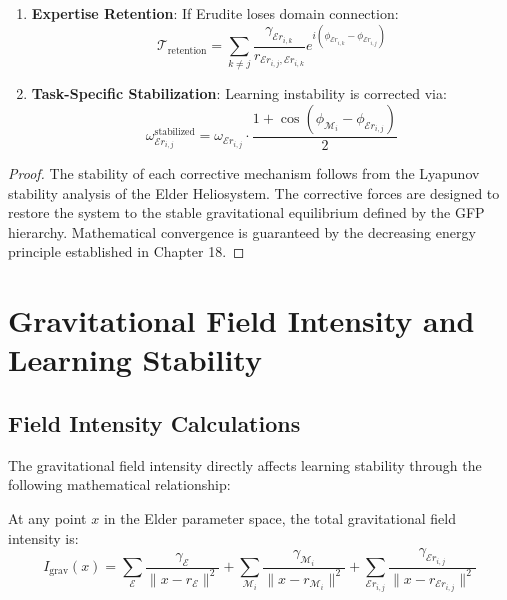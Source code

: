 \begin{theorem}
\begin{enumerate}
    \item \textbf{Expertise Retention}: If Erudite loses domain connection:
    \begin{equation}
    \mathcal{T}_{\text{retention}} = \sum_{k \neq j} \frac{\gamma_{\mathcal{E}r_{i,k}}}{r_{\mathcal{E}r_{i,j},\mathcal{E}r_{i,k}}} e^{i(\phi_{\mathcal{E}r_{i,k}} - \phi_{\mathcal{E}r_{i,j}})}
    \end{equation}
    
    \item \textbf{Task-Specific Stabilization}: Learning instability is corrected via:
    \begin{equation}
    \omega_{\mathcal{E}r_{i,j}}^{\text{stabilized}} = \omega_{\mathcal{E}r_{i,j}} \cdot \frac{1 + \cos(\phi_{\mathcal{M}_i} - \phi_{\mathcal{E}r_{i,j}})}{2}
    \end{equation}
\end{enumerate}
\end{theorem}

\begin{proof}
The stability of each corrective mechanism follows from the Lyapunov stability analysis of the Elder Heliosystem. The corrective forces are designed to restore the system to the stable gravitational equilibrium defined by the GFP hierarchy. Mathematical convergence is guaranteed by the decreasing energy principle established in Chapter 18.
\end{proof}

\section{Gravitational Field Intensity and Learning Stability}

\subsection{Field Intensity Calculations}

The gravitational field intensity directly affects learning stability through the following mathematical relationship:

\begin{definition}
At any point $x$ in the Elder parameter space, the total gravitational field intensity is:
\begin{equation}
I_{\text{grav}}(x) = \sum_{\mathcal{E}} \frac{\gamma_{\mathcal{E}}}{\|x - r_{\mathcal{E}}\|^2} + \sum_{\mathcal{M}_i} \frac{\gamma_{\mathcal{M}_i}}{\|x - r_{\mathcal{M}_i}\|^2} + \sum_{\mathcal{E}r_{i,j}} \frac{\gamma_{\mathcal{E}r_{i,j}}}{\|x - r_{\mathcal{E}r_{i,j}}\|^2}
\end{equation}
\end{definition}

